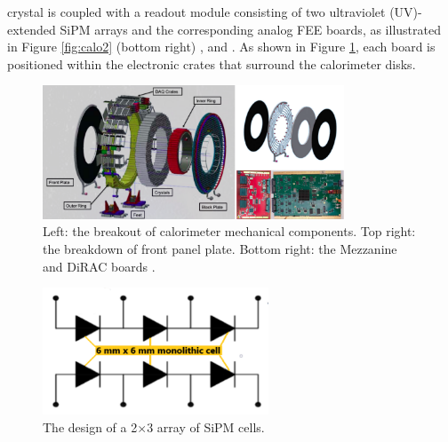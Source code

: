  crystal is coupled with a readout 
module consisting of two ultraviolet (UV)-extended SiPM arrays
and the corresponding analog FEE boards, as illustrated in Figure 
\ref{fig:calo2} (bottom right) \cite{em5}, \cite{em2} and \cite{em3}. 
As shown in Figure \ref{fig:calo3}, each board is positioned within the electronic 
crates that surround the calorimeter disks.
\begin{figure}[!h]
        \centering
        \includegraphics[width =0.8\textwidth]{figures/png/Screenshot_20240322_121017.png}
        \caption[The breakout of calorimeter mechanical components.]{Left: the breakout of calorimeter mechanical components. Top right: the breakdown of front
        panel plate. Bottom right: the Mezzanine and DiRAC boards \cite{em4}.}
        \label{fig:calo3}
        \end{figure}


\begin{figure}[!h]
    \centering
    \includegraphics[width =0.6\textwidth]{figures/png/Screenshot_20240706_141625.png}
    \caption[The design of SiPM cells.]{The design of a 2$\times$3 array of SiPM cells.}
    \label{fig:sipmcell}
\end{figure}
